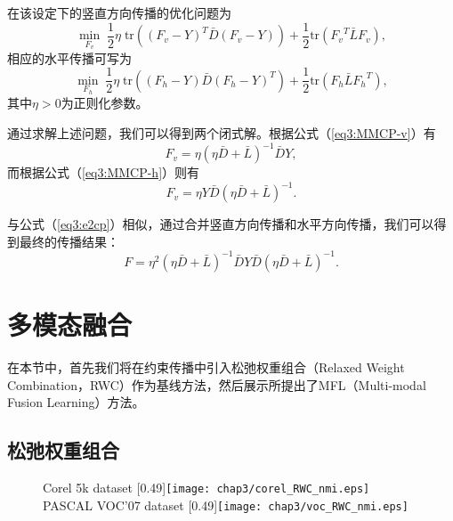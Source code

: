 在该设定下的竖直方向传播的优化问题为
\begin{equation}
\mathop{\mathrm{min}}_{{F_v}}\; \frac{1}{2}\eta\; \mathrm{tr}(({F_v}-{Y})^T\bar{{D}}({F_v}-{Y})) +\frac{1}{2}\mathrm{tr}({F_v}^T \bar{{L}}{F_v}),
\label{eq3:MMCP-v}
\end{equation}
相应的水平传播可写为
\begin{equation}
\mathop{\mathrm{min}}_{{F_h}}\;\frac{1}{2}\eta \;\mathrm{tr}( ({F_h}-{Y})\bar{{D}}({F_h}-{Y})^T)+\frac{1}{2}\mathrm{tr}({F_h} \bar{{L}}{F_h}^T),
\label{eq3:MMCP-h}
\end{equation}
其中$ \eta > 0  $为正则化参数。

通过求解上述问题，我们可以得到两个闭式解。根据公式（\ref{eq3:MMCP-v}）有
\begin{equation}
{F_v} = \eta(\eta \bar{{D}}+\bar{{L}})^{-1}\bar{{D}}{Y},
\label{eq3:sol-v}
\end{equation}
而根据公式（\ref{eq3:MMCP-h}）则有
\begin{equation}
{F_v} = \eta {Y}\bar{{D}}(\eta \bar{{D}}+\bar{{L}})^{-1}.
\label{eq3:sol-h}
\end{equation}

与公式（\ref{eq3:e2cp}）相似，通过合并竖直方向传播和水平方向传播，我们可以得到最终的传播结果：
\begin{equation}
{F} = \eta^2(\eta\bar{{D}}+\bar{{L}})^{-1}{\bar{{D}} Y\bar{{D}}}(\eta\bar{{D}}+\bar{{L}})^{-1}.
\label{}
\end{equation}

\section{多模态融合}
在本节中，首先我们将在约束传播中引入松弛权重组合（Relaxed Weight Combination，RWC）作为基线方法，然后展示所提出了MFL（Multi-modal Fusion Learning）方法。
\subsection{松弛权重组合}
\label{sec3:rwc}

\begin{figure}[t]
	\centering
					{Corel 5k dataset}
					[0.49\textwidth]{\texttt{[image: chap3/corel\_RWC\_nmi.eps]}
                    \label{fig3:rwc_corel}}
					{PASCAL VOC'07 dataset}
					[0.49\textwidth]{\texttt{[image: chap3/voc\_RWC\_nmi.eps]}
                    \label{fig3:rwc_voc}}
	\label{fig3:rwc}
\end{figure}

